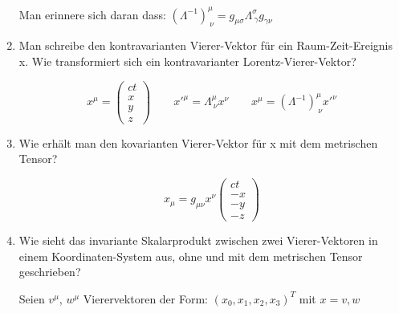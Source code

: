 \begin{enumerate}
    Man erinnere sich daran dass:
      $(\Lambda^{-1})^\mu_{\ \nu}
      =g_{\mu\sigma}\Lambda^{\sigma}_{\ \gamma}g_{\gamma\nu}$

    \item Man schreibe den kontravarianten Vierer-Vektor für ein
      Raum-Zeit-Ereignis x. Wie transformiert sich ein kontravarianter
      Lorentz-Vierer-Vektor?

      \begin{equation*}
        x^\mu =
        \begin{pmatrix}
          ct\\ x \\ y \\ z
        \end{pmatrix}
      \qquad x'^\mu = \Lambda^\mu_{\ \nu} x^\nu 
      \qquad x^\mu = (\Lambda^{-1})^\mu_{\ \nu} x'^\nu 
      \end{equation*}

    \item Wie erhält man den kovarianten Vierer-Vektor für x mit dem
      metrischen Tensor?

      \begin{equation*}
        x_\mu = g_{\mu\nu}x^\nu
        \begin{pmatrix}
          ct\\ -x \\ -y \\ -z
        \end{pmatrix}
      \end{equation*}

    \item Wie sieht das invariante Skalarprodukt zwischen zwei 
      Vierer-Vektoren in einem Koordinaten-System aus, ohne und mit
      dem metrischen Tensor geschrieben?
      
      Seien $v^\mu$, $w^\mu$ Vierervektoren der Form: 
      $(x_0, x_1, x_2, x_3)^T$ mit $x=v,w$


\end{enumerate}
